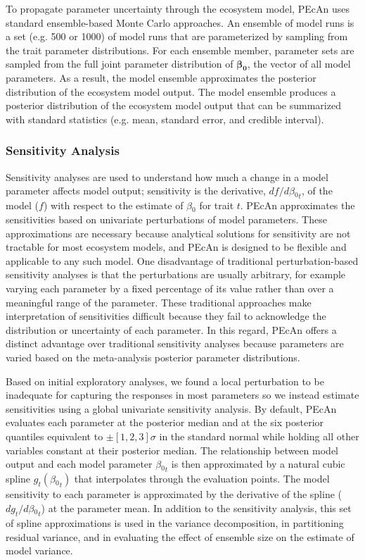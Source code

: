 \documentclass[12pt]{article}
\renewcommand{\vec}[1]{\bm{#1}} %
\begin{document}
\begin{flushleft}
\begin{spacing}{1.9}
 To propagate parameter uncertainty through the ecosystem model, PEcAn uses standard ensemble-based Monte Carlo approaches.
 An ensemble of model runs is a set (e.g. 500 or 1000) of model runs that are parameterized by sampling from the trait parameter distributions.
 For each ensemble member, parameter sets are sampled from the full joint parameter distribution of $\vec{\beta{_0}}$, the vector of all model parameters.
 As a result, the model ensemble approximates the posterior distribution of the ecosystem model output.
 The model ensemble produces a posterior distribution of the ecosystem model output that can be summarized with standard statistics (e.g. mean, standard error, and credible interval).
 
\subsubsection*{Sensitivity Analysis}

 Sensitivity analyses are used to understand how much a change in a model parameter affects model output; sensitivity is the derivative, $df/d\beta{_0}_t$, of the model ($f$) with respect to the estimate of $\beta{_0}$ for trait $t$.
 PEcAn approximates the sensitivities based on univariate perturbations of model parameters.
 These approximations are necessary because analytical solutions for sensitivity are not tractable for most ecosystem models, and PEcAn is designed to be flexible and applicable to any such model.
 One disadvantage of traditional perturbation-based sensitivity analyses is that the perturbations are usually arbitrary, for example varying each parameter by a fixed percentage of its value \citep{larocque2008uac} rather than over a meaningful range of the parameter.
 These traditional approaches make interpretation of sensitivities difficult because they fail to acknowledge the distribution or uncertainty of each parameter.
 In this regard, PEcAn offers a distinct advantage over traditional sensitivity analyses because parameters are varied based on the meta-analysis posterior parameter distributions.

 Based on initial exploratory analyses, we found a local perturbation to be inadequate for capturing the responses in most parameters so we instead estimate sensitivities using a global univariate sensitivity analysis. 
 By default, PEcAn evaluates each parameter at the posterior median and at the six posterior quantiles equivalent to $\pm [1,2,3] \sigma$ in the standard normal while holding all other variables constant at their posterior median. 
 The relationship between model output and each model parameter $\beta{_0}_t$ is then approximated by a natural cubic spline $g_t(\beta{_0}_t)$ that interpolates through the evaluation points.
 The model sensitivity to each parameter is approximated by the derivative of the spline ($dg_t/d\beta{_0}_t$) at the parameter mean.
 In addition to the sensitivity analysis, this set of spline approximations is used in the variance decomposition, in partitioning residual variance, and in evaluating the effect of ensemble size on the estimate of model variance.



\end{spacing}
\end{flushleft}
\end{document}
